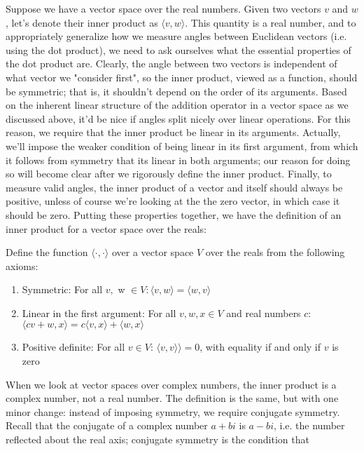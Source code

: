 \documentclass{article}
\newcommand{\n}{\leavevmode \newline}
\newcommand{\nn}{\leavevmode \newline \newline}
\begin{document}
\nn
Suppose we have a vector space over the real numbers. Given two vectors $ v $ and $ w $, let's denote their inner product as $ \langle v, w \rangle $. This quantity is a real number, and to appropriately generalize how we measure angles between Euclidean vectors (i.e. using the dot product), we need to ask ourselves what the essential properties of the dot product are. Clearly, the angle between two vectors is independent of what vector we "consider first", so the inner product, viewed as a function, should be symmetric; that is, it shouldn't depend on the order of its arguments. Based on the inherent linear structure of the addition operator in a vector space as we discussed above, it'd be nice if angles split nicely over linear operations. For this reason, we require that the inner product be linear in its arguments. Actually, we'll impose the weaker condition of being linear in its first argument, from which it follows from symmetry that its linear in both arguments; our reason for doing so will become clear after we rigorously define the inner product. Finally, to measure valid angles, the inner product of a vector and itself should always be positive, unless of course we're looking at the the zero vector, in which case it should be zero. Putting these properties together, we have the definition of an inner product for a vector space over the reals:
\n
\begin{adjustwidth}{1cm}{1cm}

    Define the function $ \langle \cdot, \cdot \rangle $ over a vector space $ V $ over the reals from the following axioms:
    \begin{enumerate}
        \item Symmetric: For all $ v, $ w $ \in V: \langle v, w \rangle = \langle w, v \rangle $
        \item Linear in the first argument: For all $ v, w, x \in V $ and real numbers $ c $: $ \langle c v + w, x \rangle = c \langle v, x \rangle + \langle w, x \rangle $
        \item Positive definite: For all $ v \in V $: $ \langle v, v \rangle  \rangle = 0 $, with equality if and only if $ v $ is zero
     \end{enumerate}

\end{adjustwidth}
\n
When we look at vector spaces over complex numbers, the inner product is a complex number, not a real number. The definition is the same, but with one minor change: instead of imposing symmetry, we require conjugate symmetry. Recall that the conjugate of a complex number $ a + b i $ is $ a - b i $, i.e. the number reflected about the real axis; conjugate symmetry is the condition that
\end{document}

